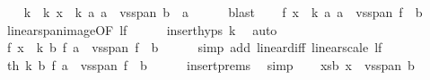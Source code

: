 \begin{isabellebody}
\ \ \isamarkupfalse%
\ k\ \ k{\isacharcolon}{\kern0pt}\ {\isachardoublequoteopen}x\ {\isacharminus}{\kern0pt}\ k\ {\isacharasterisk}{\kern0pt}a\ a\ {\isasymin}\ vs{}{\isachardot}{\kern0pt}span\ {\isacharparenleft}{\kern0pt}b\ {\isacharminus}{\kern0pt}\ {\isacharbraceleft}{\kern0pt}a{\isacharbraceright}{\kern0pt}{\isacharparenright}{\kern0pt}{\isachardoublequoteclose}\isanewline
\ \ \ \ \isamarkupfalse%
\ blast\isanewline
\ \ \isamarkupfalse%
\ {\isachardoublequoteopen}f\ {\isacharparenleft}{\kern0pt}x\ {\isacharminus}{\kern0pt}\ k\ {\isacharasterisk}{\kern0pt}a\ a{\isacharparenright}{\kern0pt}\ {\isasymin}\ vs{}{\isachardot}{\kern0pt}span\ {\isacharparenleft}{\kern0pt}f\ {\isacharbackquote}{\kern0pt}\ b{\isacharparenright}{\kern0pt}{\isachardoublequoteclose}\isanewline
\ \ \ \ \isamarkupfalse%
\ linear{\isacharunderscore}{\kern0pt}span{\isacharunderscore}{\kern0pt}image{\isacharbrackleft}{\kern0pt}OF\ lf{\isacharbrackright}{\kern0pt}\isanewline
\ \ \ \ \isamarkupfalse%
\ {\isachardoublequoteopen}insert{\isachardot}{\kern0pt}hyps{\isachardoublequoteclose}{\isacharparenleft}{\kern0pt}{}{\isacharparenright}{\kern0pt}\ k\ \isamarkupfalse%
\ auto\isanewline
\ \ \isamarkupfalse%
\ \isamarkupfalse%
\ {\isachardoublequoteopen}f\ x\ {\isacharminus}{\kern0pt}\ k\ {\isacharasterisk}{\kern0pt}b\ f\ a\ {\isasymin}\ vs{}{\isachardot}{\kern0pt}span\ {\isacharparenleft}{\kern0pt}f\ {\isacharbackquote}{\kern0pt}\ b{\isacharparenright}{\kern0pt}{\isachardoublequoteclose}\isanewline
\ \ \ \ \isamarkupfalse%
\ {\isacharparenleft}{\kern0pt}simp\ add{\isacharcolon}{\kern0pt}\ linear{\isacharunderscore}{\kern0pt}diff\ linear{\isacharunderscore}{\kern0pt}scale\ lf{\isacharparenright}{\kern0pt}\isanewline
\ \ \isamarkupfalse%
\ \isamarkupfalse%
\ th{\isacharcolon}{\kern0pt}\ {\isachardoublequoteopen}{\isacharminus}{\kern0pt}k\ {\isacharasterisk}{\kern0pt}b\ f\ a\ {\isasymin}\ vs{}{\isachardot}{\kern0pt}span\ {\isacharparenleft}{\kern0pt}f\ {\isacharbackquote}{\kern0pt}\ b{\isacharparenright}{\kern0pt}{\isachardoublequoteclose}\isanewline
\ \ \ \ \isamarkupfalse%
\ insert{\isachardot}{\kern0pt}prems{\isacharparenleft}{\kern0pt}{}{\isacharparenright}{\kern0pt}\ \isamarkupfalse%
\ simp\isanewline
\ \ \isamarkupfalse%
\ xsb{\isacharcolon}{\kern0pt}\ {\isachardoublequoteopen}x\ {\isasymin}\ vs{}{\isachardot}{\kern0pt}span\ b{\isachardoublequoteclose}\isanewline

\end{isabellebody}
